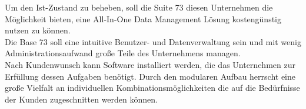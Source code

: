	Um den Ist-Zustand zu beheben, soll die Suite 73 diesen Unternehmen die Möglichkeit bieten, eine All-In-One Data Management Lösung kostengünstig nutzen zu können.\\
	Die Base 73 soll eine intuitive Benutzer- und Datenverwaltung sein und mit wenig Administrationsaufwand große Teile des Unternehmens managen.\\
	Nach Kundenwunsch kann Software installiert werden, die das Unternehmen zur Erfüllung dessen Aufgaben benötigt. Durch den modularen Aufbau herrscht eine große Vielfalt an individuellen Kombinationsmöglichkeiten die auf die Bedürfnisse der Kunden zugeschnitten werden können.
	